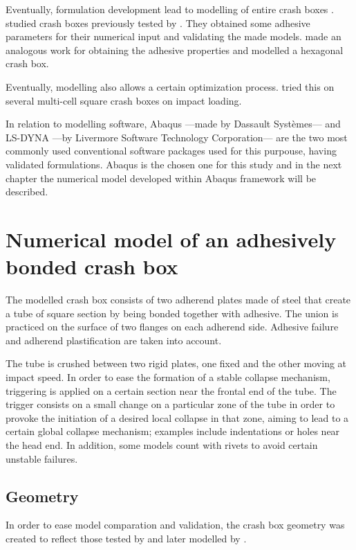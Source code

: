 \documentclass[
documentsize = a4, %
font = cmr, %
typesize = 11, %
printmode = true,
onehalfspacing = true,
language = en, %
titlepage = udciccp, %
degree = pt, %
dedication = true,
acknowledgements = true,
abstract-en = true,
abstract-es = false,
abstract-ga = false,
epigraphs = true,
toc = true,
lof = true,
lot = true,
frontmatterintoc = false,
notation = false,
minimal = false,
]{UDCthesis}
\begin{document}
Eventually, formulation development lead to modelling of entire crash boxes \citep{Scattina2011, Yang2012, Yamashita2013}. \citet{Scattina2011} studied crash boxes previously tested by \citet{Peroni2009}. They obtained some adhesive parameters for their numerical input and validating the made models. \citet{Yang2012} made an analogous work for obtaining the adhesive properties and modelled a hexagonal crash box.

Eventually, modelling also allows a certain optimization process. \citet{Hou2008} tried this on several multi-cell square crash boxes on impact loading.

In relation to modelling software, Abaqus ---made by Dassault Systèmes--- and LS-DYNA ---by Livermore Software Technology Corporation--- are the two most commonly used conventional software packages used for this purpouse, having validated formulations. Abaqus is the chosen one for this study and in the next chapter the numerical model developed within Abaqus framework will be described.

\chapter{Numerical model of an adhesively bonded crash box}
\label{model}

The modelled crash box consists of two adherend plates made of steel that create a tube of square section by being bonded together with adhesive. The union is practiced on the surface of two flanges on each adherend side. Adhesive failure and adherend plastification are taken into account.

The tube is crushed between two rigid plates, one fixed and the other moving at impact speed. In order to ease the formation of a stable collapse mechanism, triggering is applied on a certain section near the frontal end of the tube. The trigger consists on a small change on a particular zone of the tube in order to provoke the initiation of a desired local collapse in that zone, aiming to lead to a certain global collapse mechanism; examples include indentations or holes near the head end. In addition, some models count with rivets to avoid certain unstable failures.

\section{Geometry}

In order to ease model comparation and validation, the crash box geometry was created to reflect those tested by \citet{Peroni2009} and later modelled by \citet{Scattina2011}.
\end{document}

